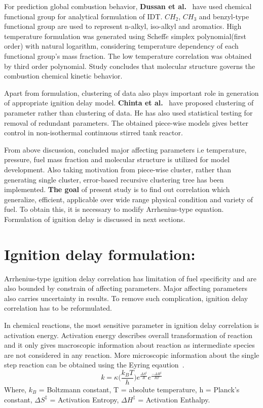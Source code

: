 \documentclass[preprint,12pt]{elsarticle}
\begin{document}
		For prediction global combustion behavior, \textbf{Dussan et al.}~\cite{dussan2019chemical} have used chemical functional group for analytical formulation of IDT. $CH_2$, $CH_3$ and benzyl-type functional group are used to represent n-alkyl, iso-alkyl and aromatics. High temperature formulation was generated using Scheff$\ddot e$ simplex polynomial(first order) with natural logarithm, considering temperature dependency of each functional group's mass fraction. The low temperature correlation was obtained by third order polynomial. Study concludes that molecular structure governs the combustion chemical kinetic behavior.
		
		Apart from formulation, clustering of data also plays important role in generation of appropriate ignition delay model. \textbf{Chinta et al.}~\cite{chinta2019prediction} have proposed clustering of parameter rather than clustering of data. He has also used statistical testing for removal of redundant parameters. The obtained piece-wise models gives better control in non-isothermal continuous stirred tank reactor. 
		
		From above discussion, concluded major affecting parameters i.e temperature, pressure, fuel mass fraction and molecular structure is utilized for model development. Also taking motivation from piece-wise cluster, rather than generating single cluster, error-based recursive clustering tree has been implemented.\textbf{ The goal} of present study is to find out correlation which generalize, efficient, applicable over wide range physical condition and variety of fuel. To obtain this, it is necessary to modify Arrhenius-type equation. Formulation of ignition delay is discussed in next sections. 
		
		\section{Ignition delay formulation:}
		
		Arrhenius-type ignition delay correlation has limitation of fuel specificity and are also bounded by constrain of affecting parameters. Major affecting parameters also carries uncertainty in results. To remove such complication, ignition delay correlation has to be reformulated. 
		
		In chemical reactions, the most sensitive parameter in ignition delay correlation is activation energy. Activation energy describes overall transformation of reaction and it only gives macroscopic information about reaction as intermediate species are not considered in any reaction. More microscopic information about the single step reaction can be obtained using the Eyring eqaution~\cite{modernbook}.
		\begin{equation}\label{eyring}
		k = \kappa\bigg( \frac{k_BT}{h} \bigg) e^{\frac{\Delta S^{\ddagger}}{R}} e^{\frac{-\Delta H^{\ddagger}}{RT}}
		\end{equation} 
		Where, $k_B$ = Boltzmann constant, T = absolute temperature, h = Planck's constant, $\Delta S^{\ddagger}$ = Activation Entropy, $\Delta H^{\ddagger}$ = Activation Enthalpy. 
		
\end{document}
